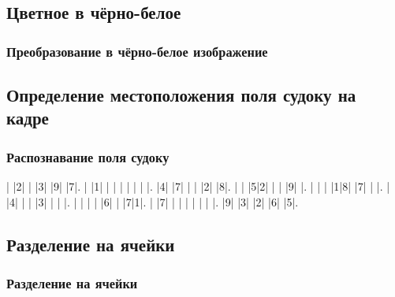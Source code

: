 \documentclass{beamer}
\begin{document}
\subsection{Цветное в чёрно-белое}
\begin{frame}
\frametitle{Преобразование в чёрно-белое изображение}
\begin{center}
\end{center}

\end{frame}


\subsection{Определение местоположения поля судоку на кадре}
\begin{frame}
\frametitle{Распознавание поля судоку}

\begin{center}
\setlength\sudokusize{6cm}
\begin{sudoku-block}
| |2| | |3| |9| |7|.
| |1| | | | | | | |.
|4| |7| | | |2| |8|.
| | |5|2| | | |9| |.
| | | |1|8| |7| | |.
| |4| | | |3| | | |.
| | | | |6| | |7|1|.
| |7| | | | | | | |.
|9| |3| |2| |6| |5|.
\end{sudoku-block}
\end{center}

\end{frame}


\subsection{Разделение на ячейки}
\begin{frame}
\frametitle{Разделение на ячейки}
\end{frame}
\end{document}
